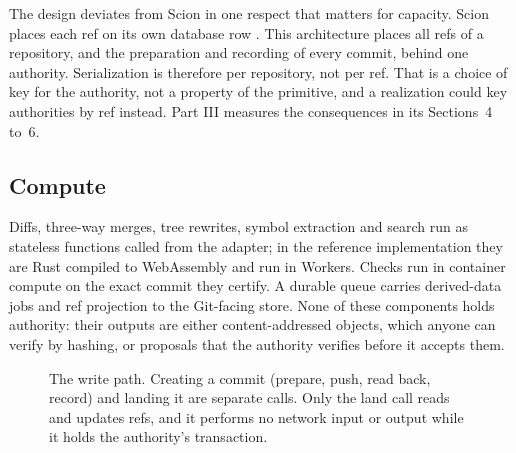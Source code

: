 \documentclass[11pt,letterpaper]{article}
\theoremstyle{definition}
\theoremstyle{remark}
\begin{document}
The design deviates from Scion in one respect that matters for capacity. Scion places each ref on its own database row \cite{anthropic2026scion}. This architecture places all refs of a repository, and the preparation and recording of every commit, behind one authority. Serialization is therefore per repository, not per ref. That is a choice of key for the authority, not a property of the primitive, and a realization could key authorities by ref instead. Part III measures the consequences in its Sections~4 to~6.

\subsection{Compute}

Diffs, three-way merges, tree rewrites, symbol extraction and search run as stateless functions called from the adapter; in the reference implementation they are Rust compiled to WebAssembly and run in Workers. Checks run in container compute on the exact commit they certify. A durable queue carries derived-data jobs and ref projection to the Git-facing store. None of these components holds authority: their outputs are either content-addressed objects, which anyone can verify by hashing, or proposals that the authority verifies before it accepts them.

\begin{figure}[t]
\centering
{}
\caption{The write path. Creating a commit (prepare, push, read back, record) and landing it are separate calls. Only the land call reads and updates refs, and it performs no network input or output while it holds the authority's transaction.}
\label{fig:tlsc:path}
\end{figure}
\end{document}
